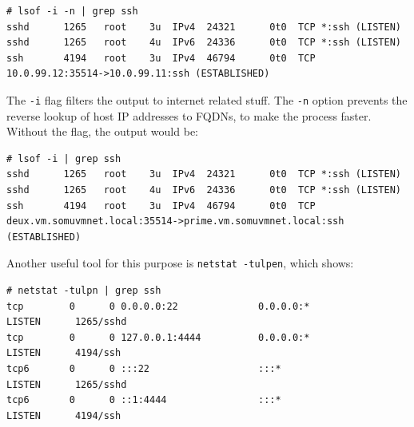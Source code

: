 \vspace{-15pt}
\begin{verbatim}
# lsof -i -n | grep ssh
sshd      1265   root    3u  IPv4  24321      0t0  TCP *:ssh (LISTEN)
sshd      1265   root    4u  IPv6  24336      0t0  TCP *:ssh (LISTEN)
ssh       4194   root    3u  IPv4  46794      0t0  TCP 10.0.99.12:35514->10.0.99.11:ssh (ESTABLISHED)
\end{verbatim}
\vspace{-10pt}	

\noindent
The \verb|-i| flag filters the output to internet related stuff. The \verb|-n| option prevents the reverse lookup of host IP addresses to FQDNs, to make the process faster. Without the flag, the output would be:

\vspace{-15pt}
\begin{verbatim}
# lsof -i | grep ssh
sshd      1265   root    3u  IPv4  24321      0t0  TCP *:ssh (LISTEN)
sshd      1265   root    4u  IPv6  24336      0t0  TCP *:ssh (LISTEN)
ssh       4194   root    3u  IPv4  46794      0t0  TCP deux.vm.somuvmnet.local:35514->prime.vm.somuvmnet.local:ssh (ESTABLISHED)
\end{verbatim}
\vspace{-10pt}	

\noindent
Another useful tool for this purpose is \verb|netstat -tulpen|, which shows:

\vspace{-15pt}
\begin{verbatim}
# netstat -tulpn | grep ssh
tcp        0      0 0.0.0.0:22              0.0.0.0:*               LISTEN      1265/sshd           
tcp        0      0 127.0.0.1:4444          0.0.0.0:*               LISTEN      4194/ssh            
tcp6       0      0 :::22                   :::*                    LISTEN      1265/sshd           
tcp6       0      0 ::1:4444                :::*                    LISTEN      4194/ssh      
\end{verbatim}
\vspace{-10pt}	